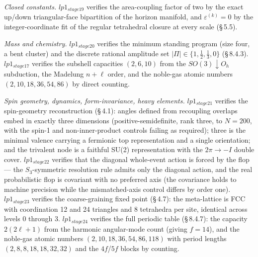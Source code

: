 \documentclass[11pt,oneside]{report}
\theoremstyle{definition}
\theoremstyle{remark}
\begin{document}
\emph{Closed constants.} \ensuremath{lp1_{stage19}} verifies the area-coupling factor of
two by the exact up/down triangular-face bipartition of the horizon
manifold, and \ensuremath{\varepsilon^{(k)} = 0} by the integer-coordinate fit of the regular
tetrahedral closure at every scale (\S\,5.5).

\emph{Mass and chemistry.} \ensuremath{lp1_{stage20}} verifies the minimum standing
program (size four, a bent cluster) and the discrete rational amplitude
set \ensuremath{|\Pi| \in \{1, \tfrac{1}{2}, \tfrac{1}{3}, 0\}} (\S\,8.4.3). \ensuremath{lp1_{stage17}} verifies the
subshell capacities \ensuremath{(2, 6, 10)} from the \ensuremath{SO(3)\downarrow O_{h}} subduction, the
Madelung \ensuremath{n+\ell} order, and the noble-gas atomic numbers
\ensuremath{(2, 10, 18, 36, 54, 86)} by direct counting.

\emph{Spin geometry, dynamics, form-invariance, heavy elements.}
\ensuremath{lp1_{stage21}} verifies the spin-geometry reconstruction (\S\,4.1): angles
defined from recoupling overlaps embed in exactly three dimensions
(positive-semidefinite, rank three, to \ensuremath{N = 200}, with the spin-1 and
non-inner-product controls failing as required); three is the minimal valence
carrying a fermionic top representation and a single orientation; and the
trivalent node is a faithful SU(2) representation with the \ensuremath{2\pi \to -I} double
cover. \ensuremath{lp1_{stage22}} verifies that the diagonal whole-event action is forced by
the flop --- the \ensuremath{S_{3}}-symmetric resolution rule admits only the diagonal
action, and the real probabilistic flop is covariant with no preferred axis (the
covariance holds to machine precision while the mismatched-axis control differs by
order one). \ensuremath{lp1_{stage23}} verifies the coarse-graining fixed point (\S\,4.7):
the meta-lattice is FCC with coordination 12 and 24 triangles and 8 tetrahedra per
site, identical across levels 0 through 3. \ensuremath{lp1_{stage24}} verifies the full
periodic table (\S\,8.4.7): the capacity \ensuremath{2(2\ell+1)} from the harmonic
angular-mode count (giving \ensuremath{f = 14}), and the noble-gas atomic numbers
\ensuremath{(2, 10, 18, 36, 54, 86, 118)} with period lengths \ensuremath{(2, 8, 8, 18, 18, 32, 32)} and
the \ensuremath{4f}/\ensuremath{5f} blocks by counting.
\end{document}
